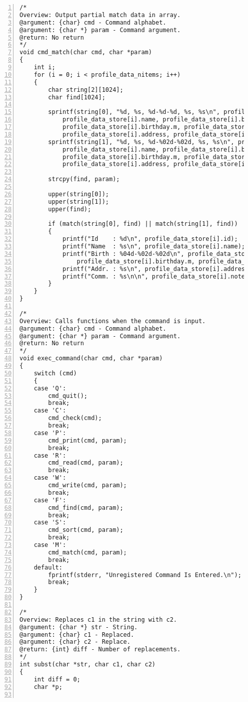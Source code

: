 \documentclass[autodetect-engine,dvi=dvipdfmx,ja=standard,
               a4j,11pt]{bxjsarticle}
\begin{document}
\begin{Verbatim}[numbers=left, xleftmargin=10mm, numbersep=6pt,
    fontsize=\small, baselinestretch=0.8]
/*
Overview: Output partial match data in array.
@argument: {char} cmd - Command alphabet.
@argument: {char *} param - Command argument.
@return: No return
*/
void cmd_match(char cmd, char *param)
{
    int i;
    for (i = 0; i < profile_data_nitems; i++)
    {
        char string[2][1024];
        char find[1024];

        sprintf(string[0], "%d, %s, %d-%d-%d, %s, %s\n", profile_data_store[i].id,
            profile_data_store[i].name, profile_data_store[i].birthday.y,
            profile_data_store[i].birthday.m, profile_data_store[i].birthday.d,
            profile_data_store[i].address, profile_data_store[i].note);
        sprintf(string[1], "%d, %s, %d-%02d-%02d, %s, %s\n", profile_data_store[i].id,
            profile_data_store[i].name, profile_data_store[i].birthday.y,
            profile_data_store[i].birthday.m, profile_data_store[i].birthday.d,
            profile_data_store[i].address, profile_data_store[i].note);

        strcpy(find, param);

        upper(string[0]);
        upper(string[1]);
        upper(find);

        if (match(string[0], find) || match(string[1], find))
        {
            printf("Id    : %d\n", profile_data_store[i].id);
            printf("Name  : %s\n", profile_data_store[i].name);
            printf("Birth : %04d-%02d-%02d\n", profile_data_store[i].birthday.y,
                profile_data_store[i].birthday.m, profile_data_store[i].birthday.d);
            printf("Addr. : %s\n", profile_data_store[i].address);
            printf("Comm. : %s\n\n", profile_data_store[i].note);
        }
    }
}

/*
Overview: Calls functions when the command is input.
@argument: {char} cmd - Command alphabet.
@argument: {char *} param - Command argument.
@return: No return
*/
void exec_command(char cmd, char *param)
{
    switch (cmd)
    {
    case 'Q':
        cmd_quit();
        break;
    case 'C':
        cmd_check(cmd);
        break;
    case 'P':
        cmd_print(cmd, param);
        break;
    case 'R':
        cmd_read(cmd, param);
        break;
    case 'W':
        cmd_write(cmd, param);
        break;
    case 'F':
        cmd_find(cmd, param);
        break;
    case 'S':
        cmd_sort(cmd, param);
        break;
    case 'M':
        cmd_match(cmd, param);
        break;
    default:
        fprintf(stderr, "Unregistered Command Is Entered.\n");
        break;
    }
}

/*
Overview: Replaces c1 in the string with c2.
@argument: {char *} str - String.
@argument: {char} c1 - Replaced.
@argument: {char} c2 - Replace.
@return: {int} diff - Number of replacements.
*/
int subst(char *str, char c1, char c2)
{
    int diff = 0;
    char *p;


\end{Verbatim}
\end{document}
